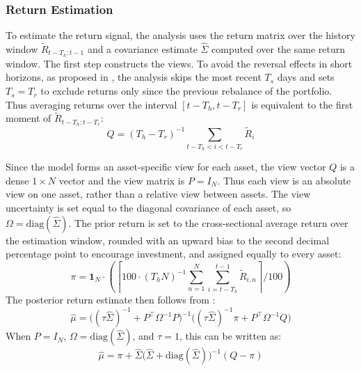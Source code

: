 \documentclass[12pt]{article}
\begin{document}
\subsubsection{Return Estimation}
To estimate the return signal, the analysis uses the return matrix over the history window $\tilde{R}_{t-T_h:t-1}$ and a covariance estimate $\hat{\Sigma}$ computed over the same return window. The first step constructs the views. To avoid the reversal effects in short horizons, as proposed in \cite{jegadeesh1993}, the analysis skips the most recent $T_s$ days and sets $T_s=T_r$ to exclude returns only since the previous rebalance of the portfolio. Thus averaging returns over the interval $[t-T_h,t-T_r]$ is equivalent to the first moment of $\tilde{R}_{t-T_h:t-T_r}$:
\begin{equation}
    Q = (T_h - T_r)^{-1}\sum_{t-T_h < i < t-T_r} \tilde{R}_i
    \label{eq:view_const}
\end{equation}

Since the model forms an asset-specific view for each asset, the view vector $Q$ is a dense $1 \times N$ vector and the view matrix is $P=I_N$. Thus each view is an absolute view on one asset, rather than a relative view between assets. The view uncertainty is set equal to the diagonal covariance of each asset, so $\Omega=\mathrm{diag}(\hat{\Sigma})$. The prior return is set to the cross-sectional average return over the estimation window, rounded with an upward bias to the second decimal percentage point to encourage investment, and assigned equally to every asset:
\begin{equation}
    \pi
    =
    \mathbf{1}_N
    \cdot
    \left(
    \left\lceil
    100 \cdot (T_h N)^{-1}
    \sum_{n=1}^{N}\sum_{i=t-T_h}^{t-1} \tilde{R}_{i,n}
    \right\rceil / 100
    \right)
    \label{eq:prior_bl}
\end{equation}
The posterior return estimate then follows from \cite{blacklitterman1992}:
\begin{equation}
    \hat{\mu}
    =
    \bigl((\tau\hat{\Sigma})^{-1} + P^{\top}\Omega^{-1}P\bigr)^{-1}
    \bigl((\tau\hat{\Sigma})^{-1}\pi + P^{\top}\Omega^{-1}Q\bigr)
    \label{eq:BL_formula}
\end{equation}
When $P=I_N$, $\Omega=\mathrm{diag}(\hat{\Sigma})$, and $\tau=1$, this can be written as:
\begin{equation}
    \hat{\mu}
    =
    \pi
    +
    \hat{\Sigma}
    \bigl(\hat{\Sigma}+\mathrm{diag}(\hat{\Sigma})\bigr)^{-1}
    (Q-\pi)
    \label{eq:BL_simplified}
\end{equation}
\end{document}
